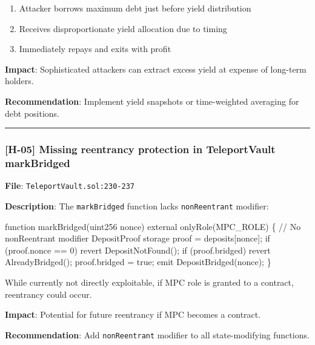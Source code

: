 \documentclass[
]{article}
\newenvironment{Shaded}{}{}
\newcommand{\NormalTok}[1]{#1}
\providecommand{\tightlist}{%
  \setlength{\itemsep}{0pt}\setlength{\parskip}{0pt}}
\begin{document}
\begin{enumerate}
\def\labelenumi{\arabic{enumi}.}
\tightlist
\item
  Attacker borrows maximum debt just before yield distribution
\item
  Receives disproportionate yield allocation due to timing
\item
  Immediately repays and exits with profit
\end{enumerate}

\textbf{Impact}: Sophisticated attackers can extract excess yield at
expense of long-term holders.

\textbf{Recommendation}: Implement yield snapshots or time-weighted
averaging for debt positions.

\begin{center}\rule{0.5\linewidth}{0.5pt}\end{center}

\subsubsection{{[}H-05{]} Missing reentrancy protection in TeleportVault
markBridged}\label{h-05-missing-reentrancy-protection-in-teleportvault-markbridged}

\textbf{File}: \texttt{TeleportVault.sol:230-237}

\textbf{Description}: The \texttt{markBridged} function lacks
\texttt{nonReentrant} modifier:

\begin{Shaded}
\begin{Highlighting}[]
\NormalTok{function markBridged(uint256 nonce) external onlyRole(MPC\_ROLE) \{}
\NormalTok{    // No nonReentrant modifier}
\NormalTok{    DepositProof storage proof = deposits[nonce];}
\NormalTok{    if (proof.nonce == 0) revert DepositNotFound();}
\NormalTok{    if (proof.bridged) revert AlreadyBridged();}
\NormalTok{    proof.bridged = true;}
\NormalTok{    emit DepositBridged(nonce);}
\NormalTok{\}}
\end{Highlighting}
\end{Shaded}

While currently not directly exploitable, if MPC role is granted to a
contract, reentrancy could occur.

\textbf{Impact}: Potential for future reentrancy if MPC becomes a
contract.

\textbf{Recommendation}: Add \texttt{nonReentrant} modifier to all
state-modifying functions.
\end{document}
